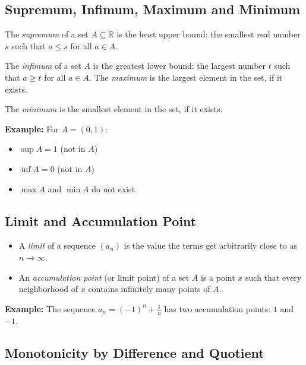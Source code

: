 \subsection{Supremum, Infimum, Maximum and Minimum}

The \emph{supremum} of a set \(A \subseteq \mathbb{R}\) is the 
least upper bound: the smallest real number \(s\) such that \(a \le s\) for all \(a \in A\).

The \emph{infimum} of a set \(A\) is the greatest lower bound: 
the largest number \(t\) such that \(a \ge t\) for all \(a \in A\). The \emph{maximum} is the largest element in the set, if it exists.

The \emph{minimum} is the smallest element in the set, if it exists.
\vspace{\baselineskip}

\textbf{Example:}
\vspace{\baselineskip}
 For \(A = (0,1)\):
\begin{itemize}[label=\(-\)]
\item \(\sup A = 1\) (not in \(A\))
\item \(\inf A = 0\) (not in \(A\))
\item \(\max A\) and \(\min A\) do not exist
\end{itemize}

\subsection{Limit and Accumulation Point}

\begin{itemize}[label=\(-\)]
\item A \emph{limit} of a sequence \((a_n)\) is the value the terms get arbitrarily close to as \(n \to \infty\).
\item An \emph{accumulation point} (or limit point) of a set \(A\) is a point \(x\) such that every neighborhood of \(x\) contains infinitely many points of \(A\).
\end{itemize}

\textbf{Example:}
\vspace{\baselineskip}
 The sequence \(a_n = {(-1)}^n + \frac{1}{n}\) has two accumulation points: \(1\) and \(-1\).

\subsection{Monotonicity by Difference and Quotient}

